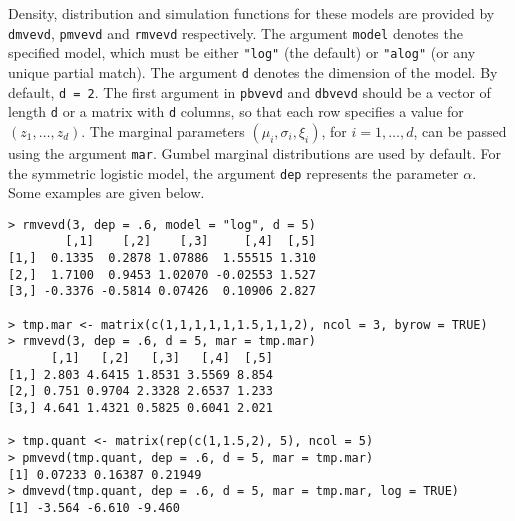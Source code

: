 \documentclass[11pt,a4paper]{article}
\begin{document}
Density, distribution and simulation functions for these models are provided by \verb+dmvevd+, \verb+pmvevd+ and \verb+rmvevd+ respectively.
The argument \verb+model+ denotes the specified model, which must be either \verb+"log"+ (the default) or \verb+"alog"+ (or any unique partial match).
The argument \verb+d+ denotes the dimension of the model.
By default, \verb+d = 2+.
The first argument in \verb+pbvevd+ and \verb+dbvevd+ should be a vector of length \verb+d+ or a matrix with \verb+d+ columns, so that each row specifies a value for $(z_1,\dots,z_d)$.
The marginal parameters $(\mu_i,\sigma_i,\xi_i)$, for $i=1,\dots,d$, can be passed using the argument \verb+mar+.
Gumbel marginal distributions are used by default.
For the symmetric logistic model, the argument  \verb+dep+ represents the parameter $\alpha$.
Some examples are given below.

\begin{verbatim}
> rmvevd(3, dep = .6, model = "log", d = 5)
        [,1]    [,2]    [,3]     [,4]  [,5]
[1,]  0.1335  0.2878 1.07886  1.55515 1.310
[2,]  1.7100  0.9453 1.02070 -0.02553 1.527
[3,] -0.3376 -0.5814 0.07426  0.10906 2.827

> tmp.mar <- matrix(c(1,1,1,1,1,1.5,1,1,2), ncol = 3, byrow = TRUE)
> rmvevd(3, dep = .6, d = 5, mar = tmp.mar)
      [,1]   [,2]   [,3]   [,4]  [,5]
[1,] 2.803 4.6415 1.8531 3.5569 8.854
[2,] 0.751 0.9704 2.3328 2.6537 1.233
[3,] 4.641 1.4321 0.5825 0.6041 2.021

> tmp.quant <- matrix(rep(c(1,1.5,2), 5), ncol = 5)
> pmvevd(tmp.quant, dep = .6, d = 5, mar = tmp.mar)
[1] 0.07233 0.16387 0.21949
> dmvevd(tmp.quant, dep = .6, d = 5, mar = tmp.mar, log = TRUE)
[1] -3.564 -6.610 -9.460
\end{verbatim}
\end{document}
